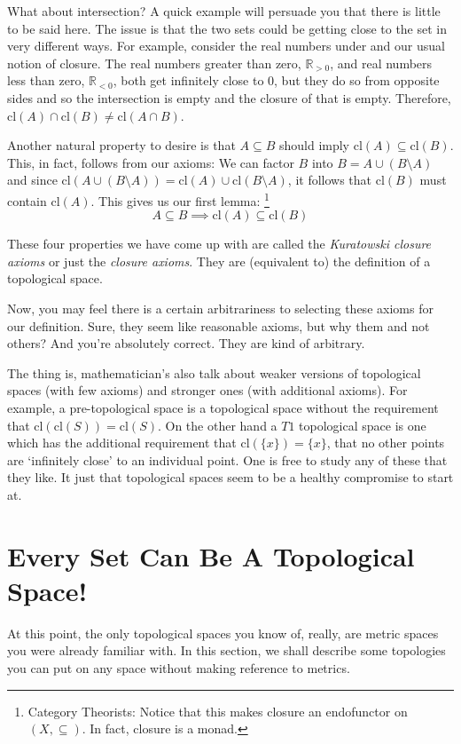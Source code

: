 \documentclass{report}
\newcommand{\cl}{\mathrm{cl}}
\begin{document}
What about intersection? A quick example will persuade you that there is little to be said here. The issue is that the two sets could be getting close to the set in very different ways. For example, consider the real numbers under and our usual notion of closure. The real numbers greater than zero, $ℝ_{>0}$, and real numbers less than zero, $ℝ_{<0}$, both get infinitely close to $0$, but they do so from opposite sides and so the intersection is empty and the closure of that is empty. Therefore, $\cl(A)∩\cl(B) ≠ \cl(A∩B)$.

Another natural property to desire is that $A ⊆ B$ should imply $\cl(A) ⊆ \cl(B)$. This, in fact, follows from our axioms: We can factor $B$ into $B = A∪(B\setminus A)$ and since $\cl(A∪(B\setminus A)) = \cl(A)∪\cl(B\setminus A)$, it follows that $\cl(B)$ must contain $\cl(A)$. This gives us our first lemma:
\footnote{Category Theorists: Notice that this makes closure an endofunctor on $(X, ⊆)$. In fact, closure is a monad.}
\begin{equation}
A ⊆ B   \implies   \cl(A) ⊆ \cl(B)   \tag{Lemma 1}
\end{equation}
  

These four properties we have come up with are called the \emph{Kuratowski closure axioms} or just the \emph{closure axioms}. They are (equivalent to) the definition of a topological space.

Now, you may feel there is a certain arbitrariness to selecting these axioms for our definition. Sure, they seem like reasonable axioms, but why them and not others? And you're absolutely correct. They are kind of arbitrary.

The thing is, mathematician's also talk about weaker versions of topological spaces (with few axioms) and stronger ones (with additional axioms). For example, a pre-topological space is a topological space without the requirement that $\cl(\cl(S)) = \cl(S)$. On the other hand a $T1$ topological space is one which has the additional requirement that $\cl(\{x\}) = \{x\}$, that no other points are `infinitely close' to an individual point. One is free to study any of these that they like. It just that topological spaces seem to be a healthy compromise to start at.

\section{Every Set Can Be A Topological Space!}

At this point, the only topological spaces you know of, really, are metric spaces you were already familiar with. In this section, we shall describe some topologies you can put on any space without making reference to metrics.
\end{document}
